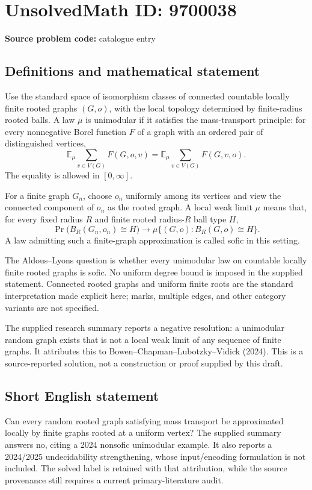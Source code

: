 \documentclass[11pt]{article}
\newcommand{\E}{\mathbb{E}}
\begin{document}
\section*{UnsolvedMath ID: 9700038}
\textbf{Source problem code:} catalogue entry
\subsection{Definitions and mathematical statement}
Use the standard space of isomorphism classes of connected countable locally finite rooted graphs $(G,o)$, with the local topology determined by finite-radius rooted balls. A law $\mu$ is unimodular if it satisfies the mass-transport principle: for every nonnegative Borel function $F$ of a graph with an ordered pair of distinguished vertices,
\[
 \E_\mu\sum_{v\in V(G)}F(G,o,v)
     =\E_\mu\sum_{v\in V(G)}F(G,v,o).
\]
The equality is allowed in $[0,\infty]$.

For a finite graph $G_n$, choose $o_n$ uniformly among its vertices and view the connected component of $o_n$ as the rooted graph. A local weak limit $\mu$ means that, for every fixed radius $R$ and finite rooted radius-$R$ ball type $H$,
\[
 \Pr\bigl(B_R(G_n,o_n)\cong H\bigr)
       \longrightarrow
 \mu\{(G,o):B_R(G,o)\cong H\}.
\]
A law admitting such a finite-graph approximation is called sofic in this setting.

The Aldous--Lyons question is whether every unimodular law on countable locally finite rooted graphs is sofic. No uniform degree bound is imposed in the supplied statement. Connected rooted graphs and uniform finite roots are the standard interpretation made explicit here; marks, multiple edges, and other category variants are not specified.

The supplied research summary reports a negative resolution: a unimodular random graph exists that is not a local weak limit of any sequence of finite graphs. It attributes this to Bowen--Chapman--Lubotzky--Vidick (2024). This is a source-reported solution, not a construction or proof supplied by this draft.
\subsection{Short English statement}
Can every random rooted graph satisfying mass transport be approximated locally by finite graphs rooted at a uniform vertex? The supplied summary answers no, citing a 2024 nonsofic unimodular example. It also reports a 2024/2025 undecidability strengthening, whose input/encoding formulation is not included. The solved label is retained with that attribution, while the source provenance still requires a current primary-literature audit.
\end{document}
